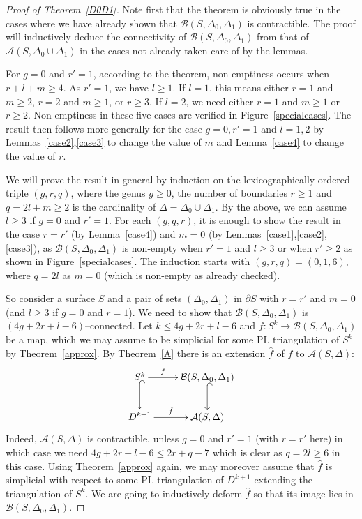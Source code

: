 \documentclass[10pt]{amsart}
\newcommand{\A}{\mathcal{A}}
\newcommand{\BB}{\mathcal{B}}
\newcommand{\De}{\Delta}
\newcommand{\del}{\partial}
\begin{document}
\begin{proof}[Proof of Theorem~\ref{D0D1}] 
Note first that the theorem is obviously true in the cases where we have already 
shown that $\BB(S,\De_0,\De_1)$ is contractible. The proof will inductively deduce the connectivity of $\BB(S,\De_0,\De_1)$ 
from that of $\A(S,\De_0\cup\De_1)$ in the
cases not already taken care of by the lemmas. 

For $g=0$ and $r'=1$, according to the theorem, non-emptiness occurs when $r+l+m\ge 4$. As $r'=1$,  we have $l\ge 1$. 
If $l=1$, this means either $r=1$ and $m\ge 2$,  $r=2$ and $m\ge 1$, or $r\ge 3$. If $l=2$, we need either $r=1$ and $m\ge 1$ or $r\ge
2$.  
Non-emptiness in these five cases are verified in Figure~\ref{specialcases}.
The result then follows more generally for the case $g=0,r'=1$ and $l=1,2$ by Lemmas~\ref{case2},\ref{case3} 
to change the value of $m$ and Lemma~\ref{case4} to
change the value of $r$. 

We will prove the result in general by induction on the lexicographically ordered triple $(g,r,q)$, where the genus $g\ge 0$, 
the number of boundaries $r\ge 1$ 
 and $q=2l+m\ge 2$ is the cardinality of $\Delta=\De_0\cup\De_1$.
By the above, we can assume $l\ge 3$ if $g=0$ and $r'=1$. 
For each $(g,q,r)$, it is enough to show the result in the case $r=r'$ (by Lemma~\ref{case4}) and $m=0$ (by Lemmas~\ref{case1},\ref{case2},\ref{case3}), 
as $\BB(S,\De_0,\De_1)$ is non-empty when $r'=1$ and $l\ge 3$ or when $r'\ge 2$ as shown in Figure~\ref{specialcases}. 
The induction starts with 
 $(g,r,q)=(0,1,6)$, where $q=2l$ as $m=0$ (which is non-empty as already checked). 







So consider a surface $S$ and a pair of sets $(\De_0,\De_1)$ in $\del S$ with $r=r'$ and  $m=0$ (and $l\ge 3$ if $g=0$ and $r=1$). 
We need to show that $\BB(S,\De_0,\De_1)$ is $(4g+2r+l-6)$--connected.
Let $k\le 4g+2r+l-6$ and 
 $f\colon S^k\to \BB(S,\De_0,\De_1)$ be a map, which we may assume to be simplicial for some PL triangulation of $S^k$ by Theorem~\ref{approx}. 
By Theorem~\ref{A} there is an extension $\hat f$ of $f$ to $\A(S,\De)$: 
$$\xymatrix{S^k \ar[r]^-f \ar@{^{(}->}[d] & \BB(S,\De_0,\De_1) \ar@{^{(}->}[d] \\
D^{k+1} \ar[r]^-{\hat f} & \A(S,\De)
}$$  
Indeed, $\A(S,\De)$ is contractible, unless $g=0$ and $r'=1$ (with $r=r'$ here) in which case we need $4g+2r+l-6\le 2r+q-7$ 
which is clear as $q=2l\ge 6$ in this case. Using Theorem~\ref{approx} again, 
we may moreover assume that $\hat f$ is simplicial with respect to some PL triangulation of $D^{k+1}$ extending the triangulation of $S^k$. 
We are going to inductively deform $\hat f$  so that its image lies in $\BB(S,\De_0,\De_1)$. 


\end{proof}
\end{document}
